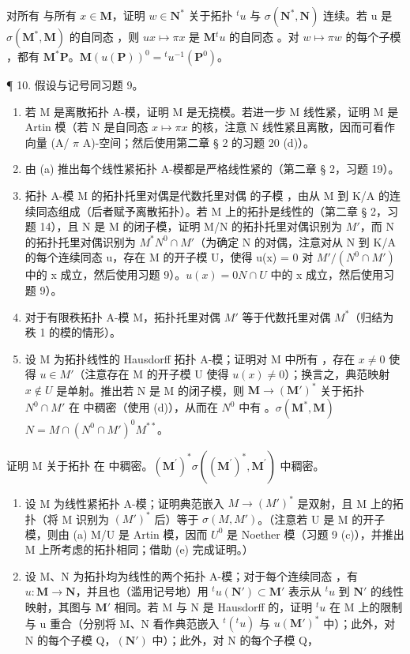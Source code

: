 对所有  与所有 \(x \in \mathbf{M}\)，证明 \(w \in \mathbf{N}^*\) 关于拓扑 \({}^t u\) 与 \(\sigma(\mathbf{N}^*, \mathbf{N})\) 连续。若 u 是 \(\sigma(\mathbf{M}^*, \mathbf{M})\) 的自同态 ，则 \(u\)\(x \mapsto \pi x\) 是 \(\mathbf{M}\)\({}^t u\) 的自同态 。对 \(w \mapsto \pi w\) 的每个子模 ，都有 \(\mathbf{M}^*\)\(\mathbf{P}\)。\(\mathbf{M}\)\((u(\mathbf{P}))^0 = {}^t u^{-1}(\mathbf{P}^0)\)。

¶ 10. 假设与记号同习题 9。

\begin{enumerate}
\def\labelenumi{(\alph{enumi})}
\item
  若 M 是离散拓扑 A-模，证明 M 是无挠模。若进一步 M 线性紧，证明 M 是 Artin 模（若 N 是自同态 \(x \mapsto \pi x\) 的核，注意 N 线性紧且离散，因而可看作向量 (A/ \(\pi\) A)-空间；然后使用第二章 § 2 的习题 20 (d)）。
\item
  由 (a) 推出每个线性紧拓扑 A-模都是严格线性紧的（第二章 § 2，习题 19）。
\item
  拓扑 A-模 M 的拓扑托里对偶是代数托里对偶  的子模 ，由从 M 到 K/A 的连续同态组成（后者赋予离散拓扑）。若 M 上的拓扑是线性的（第二章 § 2，习题 14），且 N 是 M 的闭子模，证明 M/N 的拓扑托里对偶识别为 \(M'\)，而 N 的拓扑托里对偶识别为 \(M^{*}\)\(N^{0} \cap M'\)（为确定 N 的对偶，注意对从 N 到 K/A 的每个连续同态 u，存在 M 的开子模 U，使得 u(x) = 0 对 \(M' / (N^{0} \cap M')\) 中的 x 成立，然后使用习题 9）。\(u(x) = 0\)\(N \cap U\) 中的 x 成立，然后使用习题 9）。
\item
  对于有限秩拓扑 A-模 M，拓扑托里对偶 \(M'\) 等于代数托里对偶 \(M^{*}\)（归结为秩 1 的模的情形）。
\item
  设 M 为拓扑线性的 Hausdorff 拓扑 A-模；证明对 M 中所有 ，存在 \(x \neq 0\) 使得 \(u \in M'\)（注意存在 M 的开子模 U 使得 \(u(x) \neq 0\)）；换言之，典范映射 \(x \notin U\) 是单射。推出若 N 是 M 的闭子模，则 \(\mathbf{M} \to (\mathbf{M}')^*\) 关于拓扑 \(N^0 \cap M'\) 在  中稠密（使用 (d)），从而在 \(N^0\) 中有 。\(\sigma(\mathbf{M}^*, \mathbf{M})\)\(N = M \cap (N^0 \cap M')^0\)\(M^{**}\)。
\end{enumerate}

证明 M 关于拓扑  在  中稠密。\((\mathbf{M}^{\prime})^{*}\)\(\sigma((\mathbf{M}^{\prime})^{*}, \mathbf{M}^{\prime})\) 中稠密。

\begin{enumerate}
\def\labelenumi{(\alph{enumi})}
\setcounter{enumi}{5}
\item
  设 M 为线性紧拓扑 A-模；证明典范嵌入 \(M \rightarrow (M')^{*}\) 是双射，且 M 上的拓扑（将 M 识别为 \((M')^{*}\) 后）等于 \(\sigma(M, M')\)。（注意若 U 是 M 的开子模，则由 (a) M/U 是 Artin 模，因而 \(U^{0}\) 是 Noether 模（习题 9 (c)），并推出 M 上所考虑的拓扑相同；借助 (e) 完成证明。）
\item
  设 M、N 为拓扑均为线性的两个拓扑 A-模；对于每个连续同态 ，有 \(u \colon \mathbf{M} \to \mathbf{N}\)，并且也（滥用记号地）用 \(^t u(\mathbf{N}') \subset \mathbf{M}'\) 表示从 \(^t u\) 到 \(\mathbf{N}'\) 的线性映射，其图与 \(\mathbf{M}'\) 相同。若 M 与 N 是 Hausdorff 的，证明 \(^t u\) 在 M 上的限制与 u 重合（分别将 M、N 看作典范嵌入 \(^t (^t u)\) 与 \(u\)\((\mathbf{M}')^*\) 中）；此外，对 N 的每个子模 Q，\((\mathbf{N}')\) 中）；此外，对 N 的每个子模 Q，
\end{enumerate}

